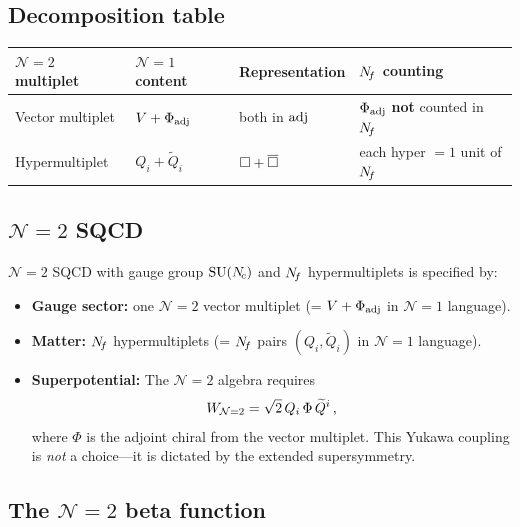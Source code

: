 \documentclass[11pt,a4paper]{article}
\begin{document}
\subsection{Decomposition table}
\label{ssec:decomp-table}

\begin{tcolorbox}[
  enhanced,
  colback=blue!5!white,
  colframe=blue!70!black,
  fonttitle=\bfseries,
  title={$\mathcal{N}=2 \to \mathcal{N}=1$ Decomposition}
]
\renewcommand{\arraystretch}{1.5}
\begin{tabular}{@{} l l l l @{}}
\toprule
\textbf{$\mathcal{N}=2$ multiplet} & \textbf{$\mathcal{N}=1$ content}
  & \textbf{Representation} & \textbf{$N_{\!f}$ counting} \\
\midrule
Vector multiplet & $V + \Phi_{\mathrm{adj}}$
  & both in $\mathrm{adj}$ & $\Phi_{\mathrm{adj}}$ \textbf{not} counted in $N_{\!f}$ \\
Hypermultiplet & $Q_i + \widetilde{Q}_i$
  & $\square + \overline{\square}$ & each hyper $= 1$ unit of $N_{\!f}$ \\
\bottomrule
\end{tabular}
\end{tcolorbox}

\subsection{$\mathcal{N}=2$ SQCD}

$\mathcal{N}=2$ SQCD with gauge group $\mathrm{SU}(N_{\!c})$ and $N_{\!f}$
hypermultiplets is specified by:
\begin{itemize}
  \item \textbf{Gauge sector:} one $\mathcal{N}=2$ vector multiplet
    (= $V + \Phi_{\mathrm{adj}}$ in $\mathcal{N}=1$ language).
  \item \textbf{Matter:} $N_{\!f}$ hypermultiplets
    (= $N_{\!f}$ pairs $(Q_i, \widetilde{Q}_i)$ in $\mathcal{N}=1$ language).
  \item \textbf{Superpotential:} The $\mathcal{N}=2$ algebra requires
    \begin{equation}\label{eq:W-N2}
      W_{\mathcal{N}=2} = \sqrt{2}\, Q_i\, \Phi\, \widetilde{Q}^i\,,
    \end{equation}
    where $\Phi$ is the adjoint chiral from the vector multiplet.  This
    Yukawa coupling is \emph{not} a choice---it is dictated by the extended
    supersymmetry.
\end{itemize}

\subsection{The $\mathcal{N}=2$ beta function}
\end{document}
